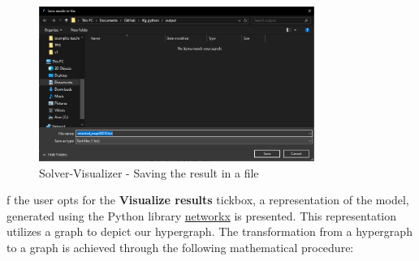 \begin{figure}[H]
    \centering
    \includegraphics[width=0.8\textwidth]{Design of the User Interface/save-as.png}
    \caption{Solver-Visualizer - Saving the result in a file}
    \label{fig:save-as}
\end{figure}

f the user opts for the \textbf{Visualize results} tickbox, a representation of the model, generated using the Python library \href{https://networkx.org/}{networkx} is presented. This representation utilizes a graph to depict our hypergraph. The transformation from a hypergraph to a graph is achieved through the following mathematical procedure:

